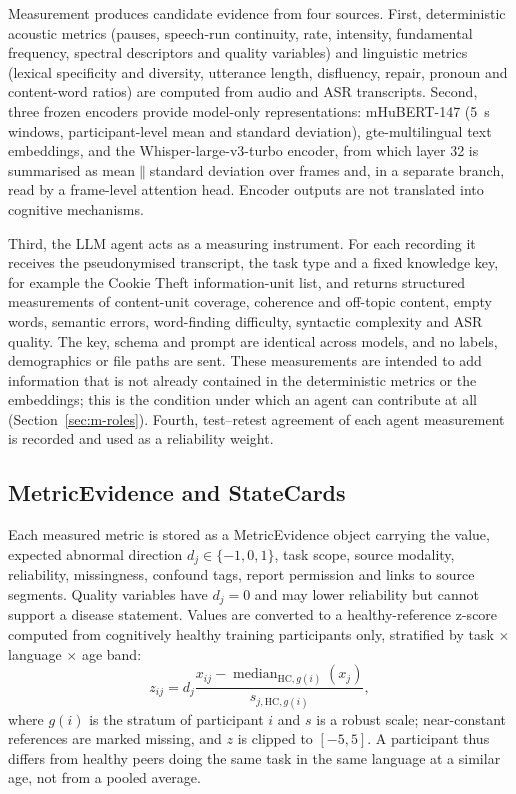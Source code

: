 \documentclass[pdflatex,sn-nature]{sn-jnl}
\begin{document}
Measurement produces candidate evidence from four sources. First, deterministic acoustic metrics (pauses, speech-run continuity, rate, intensity, fundamental frequency, spectral descriptors and quality variables) and linguistic metrics (lexical specificity and diversity, utterance length, disfluency, repair, pronoun and content-word ratios) are computed from audio and ASR transcripts. Second, three frozen encoders provide model-only representations: mHuBERT-147 (5~s windows, participant-level mean and standard deviation), gte-multilingual text embeddings, and the Whisper-large-v3-turbo encoder, from which layer 32 is summarised as mean$\|$standard deviation over frames and, in a separate branch, read by a frame-level attention head. Encoder outputs are not translated into cognitive mechanisms.

Third, the LLM agent acts as a measuring instrument. For each recording it receives the pseudonymised transcript, the task type and a fixed knowledge key, for example the Cookie Theft information-unit list, and returns structured measurements of content-unit coverage, coherence and off-topic content, empty words, semantic errors, word-finding difficulty, syntactic complexity and ASR quality. The key, schema and prompt are identical across models, and no labels, demographics or file paths are sent. These measurements are intended to add information that is not already contained in the deterministic metrics or the embeddings; this is the condition under which an agent can contribute at all (Section~\ref{sec:m-roles}). Fourth, test--retest agreement of each agent measurement is recorded and used as a reliability weight.

\subsection{MetricEvidence and StateCards}\label{sec:m-evidence}

Each measured metric is stored as a MetricEvidence object carrying the value, expected abnormal direction $d_j\in\{-1,0,1\}$, task scope, source modality, reliability, missingness, confound tags, report permission and links to source segments. Quality variables have $d_j=0$ and may lower reliability but cannot support a disease statement. Values are converted to a healthy-reference z-score computed from cognitively healthy training participants only, stratified by task $\times$ language $\times$ age band:
\begin{equation}
z_{ij}=d_j\frac{x_{ij}-\operatorname{median}_{\mathrm{HC},g(i)}(x_j)}{s_{j,\mathrm{HC},g(i)}},
\end{equation}
where $g(i)$ is the stratum of participant $i$ and $s$ is a robust scale; near-constant references are marked missing, and $z$ is clipped to $[-5,5]$. A participant thus differs from healthy peers doing the same task in the same language at a similar age, not from a pooled average.
\end{document}
